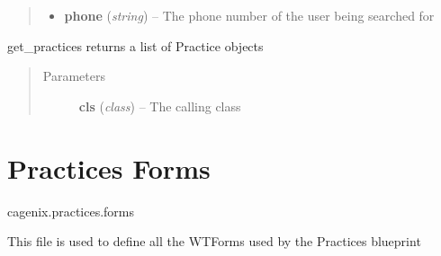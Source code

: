 \documentclass[letterpaper,10pt,english]{sphinxmanual}
\begin{document}
\begin{fulllineitems}
\begin{fulllineitems}
\begin{quote}
\begin{description}
\begin{itemize}
\item {} 
\textbf{phone} (\emph{string}) -- The phone number of the user being searched for

\end{itemize}

\end{description}\end{quote}

\end{fulllineitems}


\begin{fulllineitems}
\label{dev-practices:cagenix.practices.models.Practice.get_practices}
get\_practices returns a list of Practice objects
\begin{quote}\begin{description}
\item[{Parameters}] \leavevmode
\textbf{cls} (\emph{class}) -- The calling class

\end{description}\end{quote}

\end{fulllineitems}


\end{fulllineitems}



\section{Practices Forms}
\label{dev-practices:practices-forms-label}\label{dev-practices:practices-forms}\label{dev-practices:module-cagenix.practices.forms}
cagenix.practices.forms

This file is used to define all the WTForms used by the Practices blueprint
\end{document}
